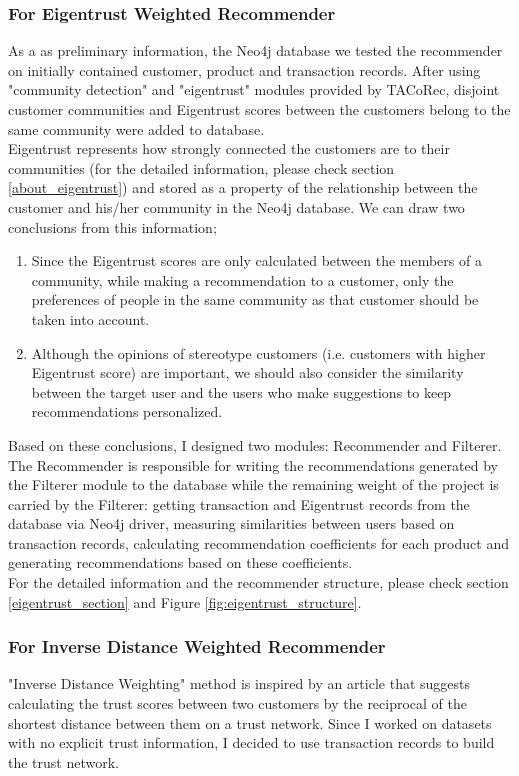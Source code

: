 \subsubsection{For Eigentrust Weighted Recommender}
As a as preliminary information, the Neo4j database we tested the recommender on initially contained customer, product and transaction records. After using "community detection" and "eigentrust" modules provided by TACoRec, disjoint customer communities and Eigentrust scores between the customers belong to the same community were added to database.\\

Eigentrust represents how strongly connected the customers are to their communities (for the detailed information, please check section \ref{about_eigentrust}) and stored as a property of the relationship between the customer and his/her community in the Neo4j database. We can draw two conclusions from this information;
\begin{enumerate}
	\item Since the Eigentrust scores are only calculated between the members of a community, while making a recommendation to a customer, only the preferences of people in the same community as that customer should be taken into account.
	\item Although the opinions of stereotype customers (i.e. customers with higher Eigentrust score) are important, we should also consider the similarity between the target user and the users who make suggestions to keep recommendations personalized.
\end{enumerate}
Based on these conclusions, I designed two modules: Recommender and Filterer. The Recommender is responsible for writing the recommendations generated by the Filterer module to the database while the remaining weight of the project is carried by the Filterer: getting transaction and Eigentrust records from the database via Neo4j driver, measuring similarities between users based on transaction records, calculating recommendation coefficients for each product and generating recommendations based on these coefficients. \\

For the detailed information and the recommender structure, please check section \ref{eigentrust_section} and Figure \ref{fig:eigentrust_structure}.
\subsubsection{For Inverse Distance Weighted Recommender}
"Inverse Distance Weighting" method is inspired by an article\cite{inverse_article} that suggests calculating the trust scores between two customers by the reciprocal of the shortest distance between them on a trust network. Since I worked on datasets with no explicit trust information, I decided to use transaction records to build the trust network. \\


